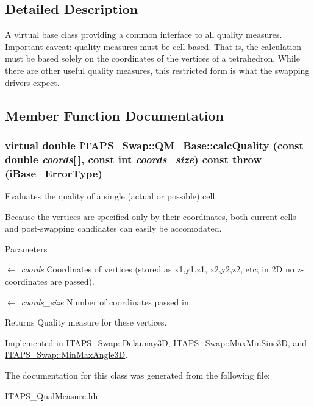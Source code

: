 \subsection{Detailed Description}
A virtual base class providing a common interface to all quality measures. Important caveat: quality measures must be cell-\/based. That is, the calculation must be based solely on the coordinates of the vertices of a tetrahedron. While there are other useful quality measures, this restricted form is what the swapping drivers expect. 

\subsection{Member Function Documentation}
\hypertarget{class_i_t_a_p_s___swap_1_1_q_m___base_aea047b3afc06b75a1115bbaddd8286ee}{
\subsubsection[{calcQuality}]{\setlength{\rightskip}{0pt plus 5cm}virtual double ITAPS\_\-Swap::QM\_\-Base::calcQuality (const double {\em coords}\mbox{[}$\,$\mbox{]}, \/  const int {\em coords\_\-size}) const  throw (iBase\_\-ErrorType)}}
\label{class_i_t_a_p_s___swap_1_1_q_m___base_aea047b3afc06b75a1115bbaddd8286ee}


Evaluates the quality of a single (actual or possible) cell. 

Because the vertices are specified only by their coordinates, both current cells and post-\/swapping candidates can easily be accomodated.


\begin{DoxyParams}{Parameters}
\item[\mbox{$\leftarrow$} {\em coords}]Coordinates of vertices (stored as x1,y1,z1, x2,y2,z2, etc; in 2D no z-\/coordinates are passed).\item[\mbox{$\leftarrow$} {\em coords\_\-size}]Number of coordinates passed in.\end{DoxyParams}
\begin{DoxyReturn}{Returns}
Quality measure for these vertices. 
\end{DoxyReturn}


Implemented in \hyperlink{class_i_t_a_p_s___swap_1_1_delaunay3_d_a5d045c523425ea05cdc4df77a4df61ce}{ITAPS\_\-Swap::Delaunay3D}, \hyperlink{class_i_t_a_p_s___swap_1_1_max_min_sine3_d_a4856dd6b9712f90d6327f1c651b90471}{ITAPS\_\-Swap::MaxMinSine3D}, and \hyperlink{class_i_t_a_p_s___swap_1_1_min_max_angle3_d_acad0f614af36012501c3aee66c0e85ea}{ITAPS\_\-Swap::MinMaxAngle3D}.



The documentation for this class was generated from the following file:\begin{DoxyCompactItemize}
\item 
ITAPS\_\-QualMeasure.hh\end{DoxyCompactItemize}
